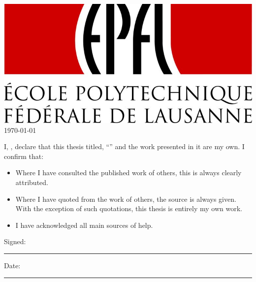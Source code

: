 \documentclass[
11pt, %
english, %
singlespacing, %
]{MastersDoctoralThesis} %
\begin{document}
\begin{titlepage}
\begin{center}
\includegraphics[scale=0.75]{Figures/EPFLLogo.jpg}\\[1cm] %
{\large \today}\\[4cm] %
\vfill
\end{center}
\end{titlepage}


\begin{declaration}
\addchaptertocentry{\authorshipname}

\noindent I, \authorname, declare that this thesis titled, \enquote{\ttitle} and the work presented in it are my own. I confirm that:

\begin{itemize} 
\item Where I have consulted the published work of others, this is always clearly attributed.
\item Where I have quoted from the work of others, the source is always given. With the exception of such quotations, this thesis is entirely my own work.
\item I have acknowledged all main sources of help.
\\
\end{itemize}
 
\noindent Signed:\\
\rule[0.5em]{25em}{0.5pt} %
 
\noindent Date:\\
\rule[0.5em]{25em}{0.5pt} %
\end{declaration}

\cleardoublepage
\end{document}
